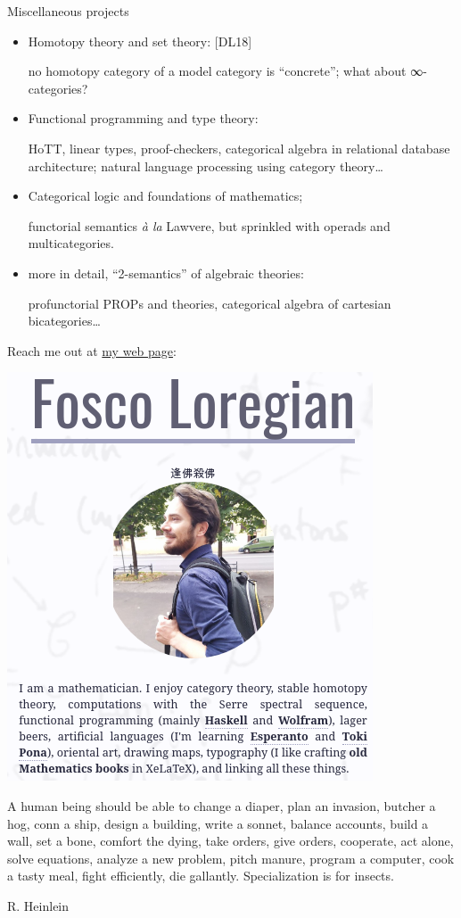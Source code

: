 \documentclass{beamer}
\def\lnk#1{\href{#1}{\faFilePdfO}}
\begin{document}
%
%
%
%
%
%
%
\begin{frame}{Miscellaneous projects}
\small
\begin{itemize}
  \item<+-> Homotopy theory and set theory: [\alert{DL18}\lnk{https://link.springer.com/article/10.1007/s40062-018-0197-3}]
  
  {\color{gray!70}\footnotesize  no homotopy category of a model category is ``concrete''; what about ∞-categories?}
  \item<+-> Functional programming and type theory:
  
  {\color{gray!70}\footnotesize  HoTT, linear types, proof-checkers, categorical algebra in relational database architecture; natural language processing using category theory\dots}
  \item<+-> Categorical logic and foundations of mathematics;
  
  {\color{gray!70}\footnotesize  functorial semantics \emph{à la} Lawvere, but sprinkled with operads and multicategories.}
  \item<+-> more in detail, ``2-semantics'' of algebraic theories: 
  
  {\color{gray!70}\footnotesize profunctorial PROPs and theories, categorical algebra of cartesian bicategories\dots}
\end{itemize}
\end{frame}
%
\begin{frame}
Reach me out at \href{http://tetrapharmakon.github.io}{my web page}:
\begin{center}
\href{http://tetrapharmakon.github.io}{
\includegraphics[width=.2\textwidth]{crop1.png}
}
\end{center}
\setlength{\epigraphwidth}{.75\textwidth}
\epigraph{\footnotesize A human being should be able to change a diaper, plan an invasion, butcher a hog, conn a ship, design a building, write a sonnet, balance accounts, build a wall, set a bone, comfort the dying, take orders, give orders, cooperate, act alone, solve equations, analyze a new problem, pitch manure, program a computer, cook a tasty meal, fight efficiently, die gallantly. Specialization is for insects.}{R. Heinlein}
\end{frame}
%
%
%
%
%
\end{document}
